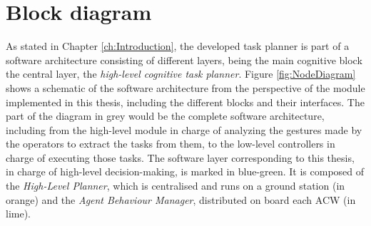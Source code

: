 \section{Block diagram}
\label{sec:NodeDiagram}
As stated in Chapter \ref{ch:Introduction}, the developed task planner is part of a software architecture consisting of different layers, being the main cognitive block the central layer, the \emph{high-level cognitive task planner}. Figure \ref{fig:NodeDiagram} shows a schematic of the software architecture from the perspective of the module implemented in this thesis, including the different blocks and their interfaces. The part of the diagram in grey would be the complete software architecture, including from the high-level module in charge of analyzing the gestures made by the operators to extract the tasks from them, to the low-level controllers in charge of executing those tasks. The software layer corresponding to this thesis, in charge of high-level decision-making, is marked in blue-green. It is composed of the \emph{High-Level Planner}, which is centralised and runs on a ground station (in orange) and the \emph{Agent Behaviour Manager}, distributed on board each \gls{ACW} (in lime).

